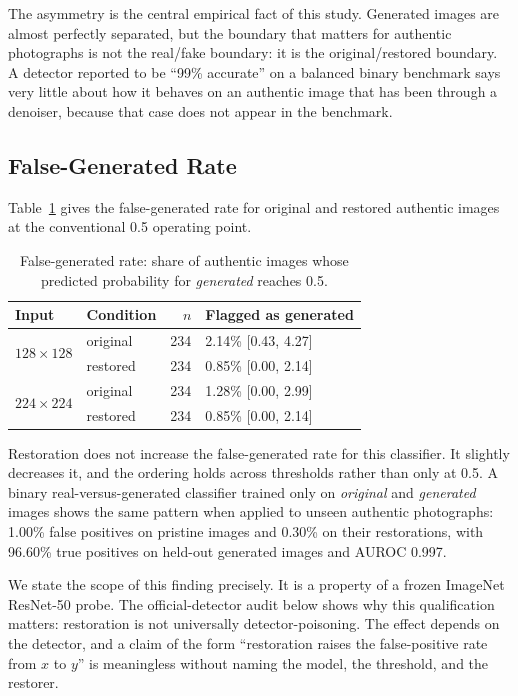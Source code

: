 ﻿\documentclass[graybox,norunningheads]{svmult}
\begin{document}
The asymmetry is the central empirical fact of this study. Generated images are
almost perfectly separated, but the boundary that matters for authentic photographs
is not the real/fake boundary: it is the original/restored boundary. A detector
reported to be ``99\% accurate'' on a balanced binary benchmark says very little
about how it behaves on an authentic image that has been through a denoiser, because
that case does not appear in the benchmark.

\subsection{False-Generated Rate}
\label{sec:fpr}

Table~\ref{tab:fpr} gives the false-generated rate for original and restored
authentic images at the conventional 0.5 operating point.

\begin{table}[t]
\centering
\caption{False-generated rate: share of authentic images whose predicted
probability for \emph{generated} reaches 0.5.}
\label{tab:fpr}
\begin{tabular}{@{}llrl@{}}
\toprule
Input & Condition & $n$ & Flagged as generated \\
\midrule
\multirow{2}{*}{$128\times128$} & original & 234 & 2.14\% [0.43, 4.27] \\
                                & restored & 234 & 0.85\% [0.00, 2.14] \\
\multirow{2}{*}{$224\times224$} & original & 234 & 1.28\% [0.00, 2.99] \\
                                & restored & 234 & 0.85\% [0.00, 2.14] \\
\bottomrule
\end{tabular}
\end{table}



Restoration does not increase the false-generated rate for this classifier. It
slightly decreases it, and the ordering holds across thresholds rather than only at
0.5. A binary real-versus-generated classifier trained only on \emph{original} and
\emph{generated} images shows the same pattern when applied to unseen authentic
photographs: 1.00\% false positives on pristine images and 0.30\% on their
restorations, with 96.60\% true positives on held-out generated images and AUROC
0.997.

We state the scope of this finding precisely. It is a property of a frozen
ImageNet ResNet-50 probe. The official-detector audit below shows why this
qualification matters: restoration is not universally detector-poisoning. The effect
depends on the detector, and a claim of the form
``restoration raises the false-positive rate from $x$ to $y$'' is meaningless
without naming the model, the threshold, and the restorer.
\end{document}
